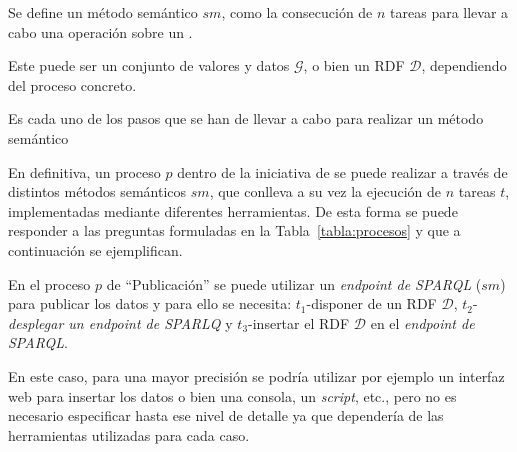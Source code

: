 \begin{definition}
Se define un método semántico $sm$, como la consecución de $n$ tareas para llevar a cabo
una operación sobre un \dataset. 
\end{definition}

Este \dataset puede ser un conjunto de valores y datos $\mathcal{G}$, o bien
un \dataset \gls{RDF} $\mathcal{D}$, dependiendo del proceso concreto.

\begin{definition}[Tarea $t$]
 Es cada uno de los pasos que se han de llevar a cabo para realizar un método semántico
\end{definition}


En definitiva, un proceso $p$ dentro de la iniciativa de \linkeddata se puede realizar a 
través de distintos métodos semánticos $sm$, que conlleva a su vez la ejecución de $n$ tareas $t$, implementadas mediante 
diferentes herramientas. De esta forma se puede responder a las preguntas formuladas en la Tabla~\ref{tabla:procesos} y 
que a continuación se ejemplifican.

\begin{Frame}
En el proceso $p$ de ``Publicación'' se puede utilizar un \textit{endpoint de SPARQL} ($sm$) para publicar
los datos y para ello se necesita: $t_1$-disponer de un \dataset RDF $\mathcal{D}$, $t_2$-\textit{desplegar un endpoint de SPARLQ} y 
$t_3$-insertar el \dataset RDF $\mathcal{D}$ en el \textit{endpoint de \gls{SPARQL}}. 
\end{Frame}

En este caso, para una mayor precisión se podría utilizar por ejemplo un interfaz web para insertar los datos 
o bien una consola, un \textit{script}, etc., pero no es necesario especificar hasta ese nivel de detalle ya que 
dependería de las herramientas utilizadas para cada caso.

